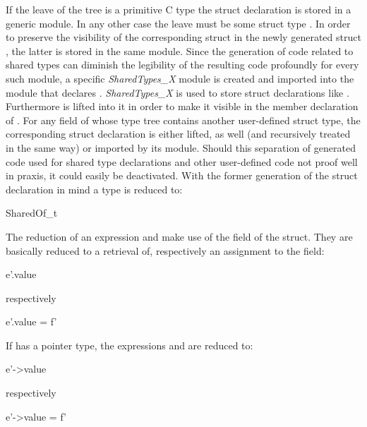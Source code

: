 \vspace{0.5cm}
If the leave of the tree is a primitive C type the struct declaration is stored in a generic module. In any other case the leave must be some struct type . In order to preserve the visibility of the corresponding struct in the newly generated struct , the latter is stored in the same module. Since the generation of code related to shared types can diminish the legibility of the resulting code profoundly for every such module, a specific \textit{SharedTypes\_X} module is created and imported into the module that declares . \textit{SharedTypes\_X} is used to store struct declarations like . Furthermore  is lifted into it in order to make it visible in the member declaration  of . For any field of  whose type tree contains another user-defined struct type, the corresponding struct declaration is either lifted, as well (and recursively treated in the same way) or imported by its module. Should this separation of generated code used for shared type declarations and other user-defined code not proof well in praxis, it could easily be deactivated.
With the former generation of the struct declaration in mind a type  is reduced to:
\begin{ccode}
SharedOf_t
\end{ccode}
The reduction of an expression  and  make use of the  field of the  struct. They are basically reduced to a retrieval of, respectively an assignment to the field:

\begin{minipage}{0.15\textwidth}
\begin{ccode}
e'.value
\end{ccode}
\end{minipage}
\begin{minipage}{0.2\textwidth}
respectively
\end{minipage}
\begin{minipage}{0.3\textwidth}
\begin{ccode}
e'.value = f'
\end{ccode}
\end{minipage}

If  has a pointer type, the expressions  and  are reduced to:

\begin{minipage}{0.15\textwidth}
\begin{ccode}
e'->value
\end{ccode}
\end{minipage}
\begin{minipage}{0.2\textwidth}
respectively
\end{minipage}
\begin{minipage}{0.3\textwidth}
\begin{ccode}
e'->value = f'
\end{ccode}
\end{minipage}

